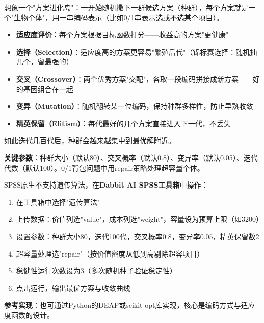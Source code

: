 \begin{algoprinciple}
想象一个"方案进化岛"：一开始随机撒下一群候选方案（种群），每个方案就是一个"生物个体"，用一串编码表示（比如0/1串表示选或不选某个项目）。

\begin{itemize}
    \item \textbf{适应度评价}：每个方案根据目标函数打分——收益高的方案"更健康"
    \item \textbf{选择（Selection）}：适应度高的方案更容易"繁殖后代"（锦标赛选择：随机抽几个，留最强的）
    \item \textbf{交叉（Crossover）}：两个优秀方案"交配"，各取一段编码拼接成新方案——好的基因组合在一起
    \item \textbf{变异（Mutation）}：随机翻转某一位编码，保持种群多样性，防止早熟收敛
    \item \textbf{精英保留（Elitism）}：每代最好的几个方案直接进入下一代，不丢失
\end{itemize}

如此迭代几百代后，种群会越来越集中到最优解附近。

\textbf{关键参数}：种群大小（默认80）、交叉概率（默认0.8）、变异率（默认0.05）、迭代代数（默认100）。0/1背包问题中用repair策略处理超容量个体。
\end{algoprinciple}

\begin{algosposs}
SPSS原生不支持遗传算法，在\textbf{Dabbit AI SPSS工具箱}中操作：

\begin{enumerate}
    \item 在工具箱中选择"遗传算法"
    \item 上传数据：价值列选"value"，成本列选"weight"，容量设为预算上限（如3200）
    \item 设置参数：种群大小80，迭代100代，交叉概率0.8，变异率0.05，精英保留数2
    \item 超容量处理选"repair"（按价值密度从低到高剔除超容项目）
    \item 稳健性运行次数设为3（多次随机种子验证稳定性）
    \item 点击运行，输出最优方案与收敛曲线
\end{enumerate}

\textbf{参考实现}：也可通过Python的DEAP或scikit-opt库实现，核心是编码方式与适应度函数的设计。
\end{algosposs}

